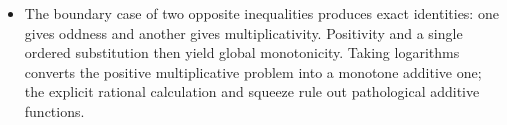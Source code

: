 \begin{takeaways}
\begin{itemize}
\item The boundary case of two opposite inequalities produces exact identities: one
gives oddness and another gives multiplicativity. Positivity and a single ordered
substitution then yield global monotonicity. Taking logarithms converts the
positive multiplicative problem into a monotone additive one; the explicit
rational calculation and squeeze rule out pathological additive functions.
\end{itemize}
\end{takeaways}